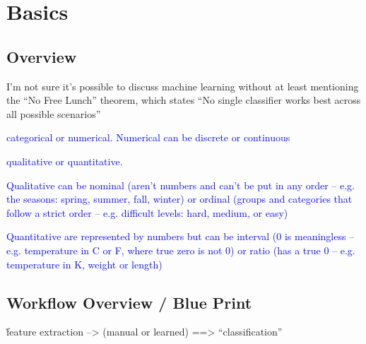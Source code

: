 \chapter{Basics}

\section{Overview}

I'm not sure it's possible to discuss machine learning without at least mentioning the ``No Free Lunch'' theorem, which states ``No single classifier works best across all possible scenarios''

\textcolor{blue}{categorical or numerical. Numerical can be discrete or continuous}

\textcolor{blue}{qualitative or quantitative.} 

\textcolor{blue}{Qualitative can be nominal (aren't numbers and can't be put in any order -- e.g. the seasons: spring, summer, fall, winter) or ordinal (groups and categories that follow a strict order -- e.g. difficult levels: hard, medium, or easy)}

\textcolor{blue}{Quantitative are represented by numbers but can be interval (0 is meaningless -- e.g. temperature in C or F, where true zero is not 0) or ratio (has a true 0 -- e.g. temperature in K, weight or length)}

\section{Workflow Overview / Blue Print}

\r{feature extraction --> (manual or learned) ==> ``classification''}

